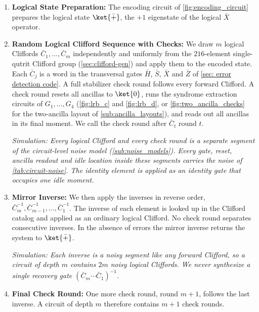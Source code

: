 \begin{enumerate}
    \item \textbf{Logical State Preparation:} The encoding circuit of \autoref{fig:encoding_circuit} prepares the logical state $\ket{\bar{+}}$, the $+1$ eigenstate of the logical $\bar{X}$ operator.

    \item \textbf{Random Logical Clifford Sequence with Checks:} We draw $m$ logical Cliffords $\bar C_1, \dots, \bar C_m$ independently and uniformly from the $216$-element single-qutrit Clifford group (\autoref{sec:clifford-gen}) and apply them to the encoded state. Each $\bar C_j$ is a word in the transversal gates $\bar H$, $\bar S$, $\bar X$ and $\bar Z$ of \autoref{sec: error detection code}. A full stabilizer check round follows every forward Clifford. A check round resets all ancillas to $\ket{0}$, runs the syndrome extraction circuits of $G_1, \dots, G_4$ (\autoref{fig:lrb_c} and \autoref{fig:lrb_d}, or \autoref{fig:two_ancilla_checks} for the two-ancilla layout of \autoref{sub:ancilla_layouts}), and reads out all ancillas in its final moment. We call the check round after $\bar C_t$ round $t$.

    \textit{Simulation: Every logical Clifford and every check round is a separate segment of the circuit-level noise model (\autoref{sub:noise_models}). Every gate, reset, ancilla readout and idle location inside these segments carries the noise of \autoref{tab:circuit-noise}. The identity element is applied as an identity gate that occupies one idle moment.}

    \item \textbf{Mirror Inverse:} We then apply the inverses in reverse order, $\bar C_m^{-1}, \bar C_{m-1}^{-1}, \dots, \bar C_1^{-1}$. The inverse of each element is looked up in the Clifford catalog and applied as an ordinary logical Clifford. No check round separates consecutive inverses. In the absence of errors the mirror inverse returns the system to $\ket{\bar{+}}$.

    \textit{Simulation: Each inverse is a noisy segment like any forward Clifford, so a circuit of depth $m$ contains $2m$ noisy logical Cliffords. We never synthesize a single recovery gate $(\bar C_m \cdots \bar C_1)^{-1}$.}

    \item \textbf{Final Check Round:} One more check round, round $m+1$, follows the last inverse. A circuit of depth $m$ therefore contains $m+1$ check rounds.


\end{enumerate}
